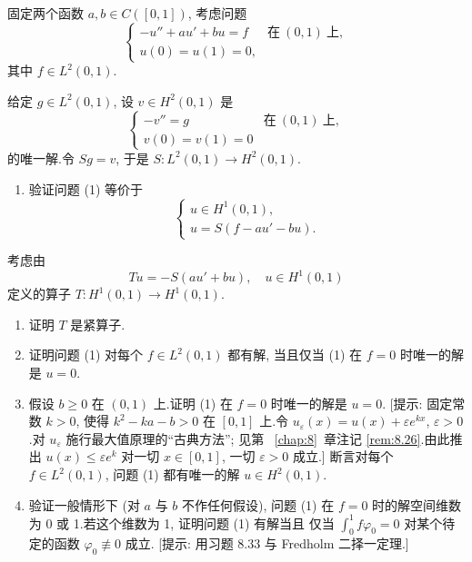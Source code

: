 \begin{exercise}
\label{exer:8.35}
固定两个函数 $a,b\in C([0,1])$, 考虑问题
\begin{equation}
\begin{cases}
-u''+au'+bu=f & \text{在}\ (0,1)\ \text{上},\\
u(0)=u(1)=0,
\end{cases}
\tag{1}
\end{equation}
其中 $f\in L^2(0,1)$.

给定 $g\in L^2(0,1)$, 设 $v\in H^2(0,1)$ 是
\begin{equation}
\begin{cases}
-v''=g & \text{在}\ (0,1)\ \text{上},\\
v(0)=v(1)=0
\end{cases}
\tag{2}
\end{equation}
的唯一解.令 $Sg=v$, 于是 $S:L^2(0,1)\to H^2(0,1)$.
\begin{enumerate}[label=\arabic*., leftmargin=2.2em, itemsep=0.3em]
	\item 验证问题 (1) 等价于
	      \begin{equation}
	      \begin{cases}
	      u\in H^1(0,1),\\
	      u=S(f-au'-bu).
	      \end{cases}
	      \tag{3}
	      \end{equation}
\end{enumerate}
考虑由
\begin{equation*}
Tu=-S(au'+bu),\quad u\in H^1(0,1)
\end{equation*}
定义的算子 $T:H^1(0,1)\to H^1(0,1)$.
\begin{enumerate}[label=\arabic*., leftmargin=2.2em, itemsep=0.3em, start=2]
	\item 证明 $T$ 是紧算子.
	\item 证明问题 (1) 对每个 $f\in L^2(0,1)$ 都有解, 当且仅当 (1) 在
	      $f=0$ 时唯一的解是 $u=0$.
	\item 假设 $b\ge0$ 在 $(0,1)$ 上.证明 (1) 在 $f=0$ 时唯一的解是
	      $u=0$.
	      [提示: 固定常数 $k>0$, 使得 $k^2-ka-b>0$ 在 $[0,1]$ 上.令
	      $u_\varepsilon(x)=u(x)+\varepsilon e^{kx}$, $\varepsilon>0$.对
	      $u_\varepsilon$ 施行最大值原理的``古典方法''; 见第~
\ref{chap:8}~章注记
	      \ref{rem:8.26}.由此推出 $u(x)\le\varepsilon e^k$ 对一切
	      $x\in[0,1]$, 一切 $\varepsilon>0$ 成立.]
	      断言对每个 $f\in L^2(0,1)$, 问题 (1) 都有唯一的解
	      $u\in H^2(0,1)$.
	\item 验证一般情形下 (对 $a$ 与 $b$ 不作任何假设), 问题 (1) 在 $f=0$
	      时的解空间维数为 0 或 1.若这个维数为 1, 证明问题 (1) 有解当且
	      仅当 $\int_0^1f\varphi_0=0$ 对某个待定的函数
	      $\varphi_0\not\equiv0$ 成立.
	      [提示: 用习题 8.33 与 Fredholm 二择一定理.]
\end{enumerate}
\end{exercise}

